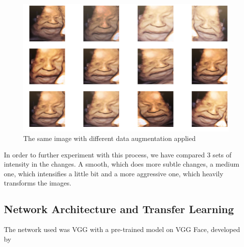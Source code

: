\begin{figure}[h!tp]
    \centering
    \includegraphics[width=.9\textwidth]{imgs/chap3_data_augmentation.png}
    \caption{The same image with different data augmentation applied}
    \label{fig:data_augmentation}
\end{figure}

In order to further experiment with this process, we have compared 3 sets of intensity in the changes. A smooth, which does more subtle changes, a medium one, which intensifies a little bit and a more aggressive one, which heavily transforms the images.  

\subsection{Network Architecture and Transfer Learning}

The network used was VGG with a pre-trained model on VGG Face, developed by \citeauthor{ParkhiVZ15}



